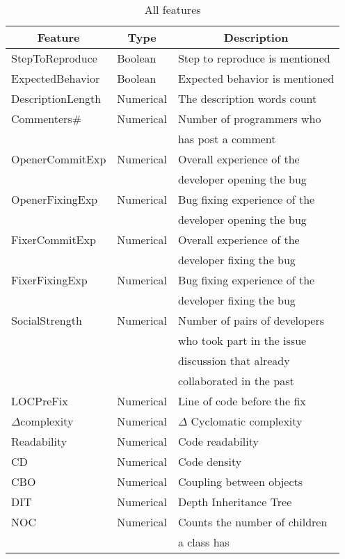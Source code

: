 \documentclass[sigconf,review]{acmart}
\begin{document}
\begin{table}[h]
\caption{All features} \label{weka:features}
\begin{tabular}{lll}
\hline
\hline
\multicolumn{1}{c}{Feature}
& \multicolumn{1}{c}{Type}
&	\multicolumn{1}{c}{Description}    \\  
\hline  
	StepToReproduce		  & Boolean & Step to reproduce is mentioned \\
	ExpectedBehavior 	  & Boolean & Expected behavior is mentioned \\
	DescriptionLength	  & Numerical & The description words count\\
	Commenters\#    & Numerical & Number of programmers who \\&& has post a comment \\

   OpenerCommitExp & Numerical & Overall experience of the \\&& developer opening the bug \\     
   OpenerFixingExp & Numerical & Bug fixing experience of the \\&& developer opening the bug \\
   FixerCommitExp & Numerical & Overall experience of the \\&& developer fixing the bug\\
   FixerFixingExp & Numerical & Bug fixing experience of the \\&& developer fixing the bug\\
   SocialStrength 		 & Numerical & Number of pairs of developers \\&&who took part in the issue \\&&discussion that already \\&&collaborated in the past\\

   LOCPreFix 			&Numerical& Line of code before the fix\\
   $\Delta$complexity   &Numerical& $\Delta$ Cyclomatic complexity\\
   Readability			&Numerical& Code readability\\
   CD 					&Numerical& Code density\\

   
   CBO &Numerical& Coupling between objects \\

	DIT &Numerical& Depth Inheritance Tree \\

NOC &Numerical&  Counts the number of children \\&&a class has\\


\end{tabular}
\end{table}
\end{document}
